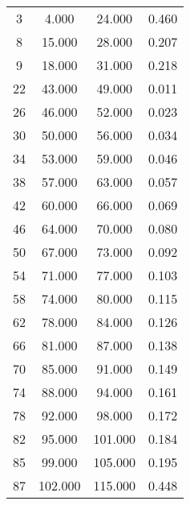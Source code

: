 % 
\begin{tabular}{cccc}
  \hline
  \hline
3 & 4.000 & 24.000 & 0.460 \\ 
  8 & 15.000 & 28.000 & 0.207 \\ 
  9 & 18.000 & 31.000 & 0.218 \\ 
  22 & 43.000 & 49.000 & 0.011 \\ 
  26 & 46.000 & 52.000 & 0.023 \\ 
  30 & 50.000 & 56.000 & 0.034 \\ 
  34 & 53.000 & 59.000 & 0.046 \\ 
  38 & 57.000 & 63.000 & 0.057 \\ 
  42 & 60.000 & 66.000 & 0.069 \\ 
  46 & 64.000 & 70.000 & 0.080 \\ 
  50 & 67.000 & 73.000 & 0.092 \\ 
  54 & 71.000 & 77.000 & 0.103 \\ 
  58 & 74.000 & 80.000 & 0.115 \\ 
  62 & 78.000 & 84.000 & 0.126 \\ 
  66 & 81.000 & 87.000 & 0.138 \\ 
  70 & 85.000 & 91.000 & 0.149 \\ 
  74 & 88.000 & 94.000 & 0.161 \\ 
  78 & 92.000 & 98.000 & 0.172 \\ 
  82 & 95.000 & 101.000 & 0.184 \\ 
  85 & 99.000 & 105.000 & 0.195 \\ 
  87 & 102.000 & 115.000 & 0.448 \\ 
   \hline
\end{tabular}
